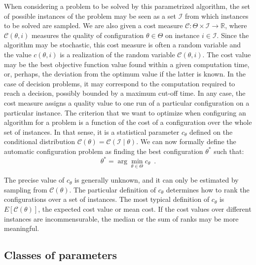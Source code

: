 \documentclass[a4paper]{article}
\begin{document}
When considering a problem to be solved by this parametrized
algorithm, the set of possible instances of the problem may be seen as
a set $\mathcal{I}$ from which instances to be solved are
sampled. We are also given a cost measure $\mathcal{C}\colon \Theta
\times \mathcal{I} \to \mathbb{R}$, where $\mathcal{C}(\theta, i)$
measures the quality of configuration $\theta \in \Theta$ on instance
$i \in \mathcal{I}$. Since the algorithm may be stochastic, this cost
measure is often a random variable and the value $c(\theta, i)$ is a
realization of the random variable $\mathcal{C}(\theta, i)$. The cost
value may be the best objective function value found within a given
computation time, or, perhaps, the deviation from the optimum value if
the latter is known. In the case of decision problems, it may
correspond to the computation required to reach a decision, possibly
bounded by a maximum cut-off time. In any case, the cost measure
assigns a quality value to one run of a particular configuration on a
particular instance. The criterion that we want to optimize when
configuring an algorithm for a problem is a function of the cost of a
configuration over the whole set of instances. In that sense, it is a
statistical parameter $c_\theta$ defined on the conditional
distribution $\mathcal{C}(\theta) = \mathcal{C}(\mathcal{I} \mid
\theta)$. We can now formally define the automatic configuration
problem as finding the best configuration $\theta^*$ such that:
%
\begin{equation}\label{eq:autoconf}
 \theta^* = \arg\min_{\theta \in \Theta} c_\theta\enspace. 
\end{equation}

The precise value of $c_\theta$ is generally unknown, and it can only
be estimated by sampling from $\mathcal{C}(\theta)$. The particular
definition of $c_\theta$ determines how to rank the configurations
over a set of instances. The most typical definition of $c_\theta$ is
$E[\mathcal{C}(\theta)]$, the expected cost value or mean cost. If the cost values over different instances are incommensurable,
the median or the sum of ranks may be more meaningful.



\subsection{Classes of parameters}
\end{document}
